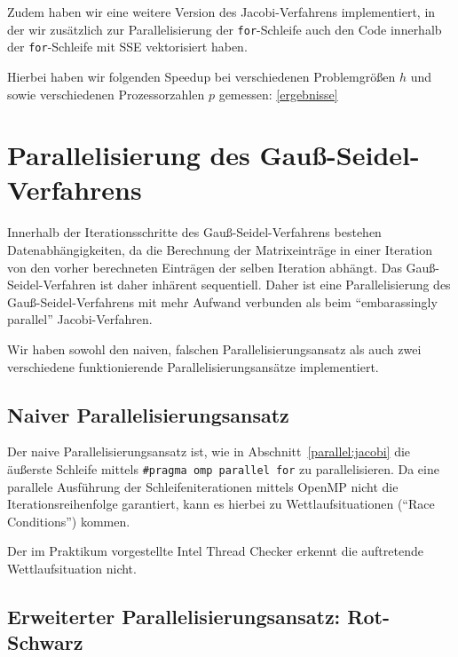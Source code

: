\documentclass{article}
\begin{document}
Zudem haben wir eine weitere Version des Jacobi-Verfahrens implementiert, in der wir zusätzlich zur Parallelisierung der \texttt{for}-Schleife auch den Code innerhalb der \texttt{for}-Schleife mit SSE vektorisiert haben.

Hierbei haben wir folgenden Speedup bei verschiedenen Problemgrößen $h$ und sowie verschiedenen Prozessorzahlen $p$ gemessen: \ref{ergebnisse}

\section{Parallelisierung des Gauß-Seidel-Verfahrens}

Innerhalb der Iterationsschritte des Gauß-Seidel-Verfahrens bestehen Datenabhängigkeiten, da die Berechnung der Matrixeinträge in einer Iteration von den vorher berechneten Einträgen der selben Iteration abhängt. Das Gauß-Seidel-Verfahren ist daher inhärent sequentiell. Daher ist eine Parallelisierung des Gauß-Seidel-Verfahrens mit mehr Aufwand verbunden als beim ``embarassingly parallel'' Jacobi-Verfahren.

Wir haben sowohl den naiven, falschen Parallelisierungsansatz als auch zwei verschiedene funktionierende Parallelisierungsansätze implementiert.

\subsection{Naiver Parallelisierungsansatz}\label{gs:naiv}
Der naive Parallelisierungsansatz ist, wie in Abschnitt~\ref{parallel:jacobi} die äußerste Schleife mittels \texttt{\#pragma omp parallel for} zu parallelisieren. Da eine parallele Ausführung der Schleifeniterationen mittels OpenMP nicht die Iterationsreihenfolge garantiert, kann es hierbei zu Wettlaufsituationen (``Race Conditions'') kommen.

Der im Praktikum vorgestellte Intel Thread Checker erkennt die auftretende Wettlaufsituation nicht.


\subsection{Erweiterter Parallelisierungsansatz: Rot-Schwarz}
\end{document}
